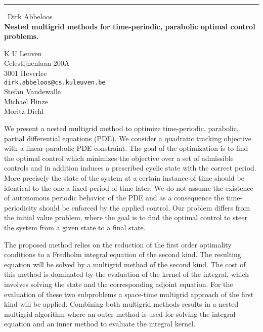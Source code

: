 \documentclass{report}
\begin{document}
\begin{center}
\rule{6in}{1pt} \
{\large Dirk Abbeloos \\
{\bf Nested multigrid methods for time-periodic, parabolic optimal control problems.}}

K U Leuven \\ Celestijnenlaan 200A \\ 3001 Heverlee
\\
{\tt dirk.abbeloos@cs.kuleuven.be}\\
Stefan Vandewalle \\
Michael Hinze\\
Moritz Diehl\end{center}

We present a nested multigrid method to optimize time-periodic,
parabolic, partial differential equations (PDE). We consider a quadratic
tracking objective with a linear parabolic PDE constraint. The goal of
the optimization is to find the optimal control which minimizes the
objective over a set of admissible controls and in addition induces a
prescribed cyclic state with the correct period. More precisely the state
of the system at a certain instance of time should be identical to the
one a fixed period of time later. We do not assume the existence of
autonomous periodic behavior of the PDE and as a consequence the
time-periodicity should be enforced by the applied control. Our problem
differs from the initial value problem, where the goal is to find the
optimal control to steer the system from a given state to a final state.

The proposed method relies on the reduction of the first order optimality
conditions to a Fredholm integral equation of the second kind. The
resulting equation will be solved by a multigrid method of the second
kind. The cost of this method is dominated by the evaluation of the
kernel of the integral, which involves solving the state and the
corresponding adjoint equation. For the evaluation of these two
subproblems a space-time multigrid approach of the first kind will be
applied. Combining both multigrid methods results in a nested multigrid
algorithm where an outer method is used for solving the integral equation
and an inner method to evaluate the integral kernel.
\end{document}
